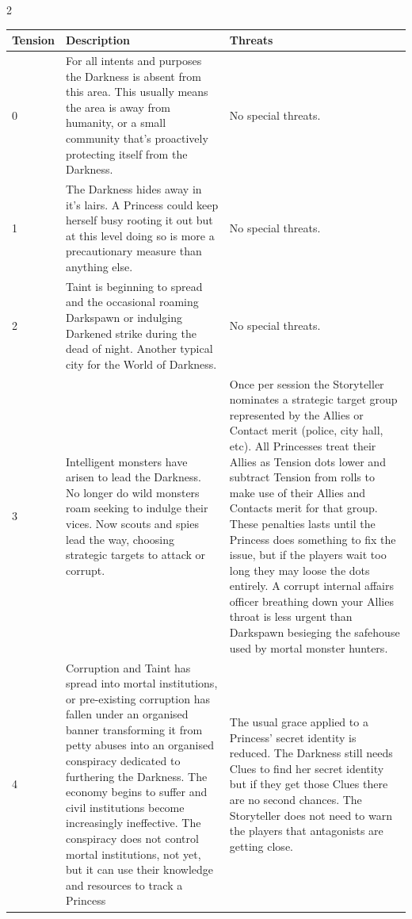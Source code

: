\begin{multicols}{2}
\end{multicols}\begin{longtable}{|l|p{7cm}|p{7cm}|}
        \hline
        Tension & Description & Threats\\ \hline
		0 & For all intents and purposes the Darkness is absent from this area. This usually means the area is away from humanity, or a small community that's proactively protecting itself from the Darkness. & No special threats.\\ \hline
		1 & The Darkness hides away in it's lairs. A Princess could keep herself busy rooting it out but at this level doing so is more a precautionary measure than anything else. & No special threats.\\ \hline
        2 & Taint is beginning to spread and the occasional roaming Darkspawn or indulging Darkened strike during the dead of night. Another typical city for the World of Darkness. & No special threats. \\ \hline
		3 & Intelligent monsters have arisen to lead the Darkness. No longer do wild monsters roam seeking to indulge their vices. Now scouts and spies lead the way, choosing strategic targets to attack or corrupt. & Once per session the Storyteller nominates a strategic target group represented by the Allies or Contact merit (police, city hall, etc). All Princesses treat their Allies as Tension dots lower and subtract Tension from rolls to make use of their Allies and Contacts merit for that group. These penalties lasts until the Princess does something to fix the issue, but if the players wait too long they may loose the dots entirely. A corrupt internal affairs officer breathing down your Allies throat is less urgent than Darkspawn besieging the safehouse used by mortal monster hunters.\\ \hline
		4 & Corruption and Taint has spread into mortal institutions, or pre-existing corruption has fallen under an organised banner transforming it from petty abuses into an organised conspiracy dedicated to furthering the Darkness. The economy begins to suffer and civil institutions become increasingly ineffective. The conspiracy does not control mortal institutions, not yet, but it can use their knowledge and resources to track a Princess & The usual grace applied to a Princess' secret identity is reduced. The Darkness still needs Clues to find her secret identity but if they get those Clues there are no second chances. The Storyteller does not need to warn the players that antagonists are getting close. \\ \hline

\end{longtable}
